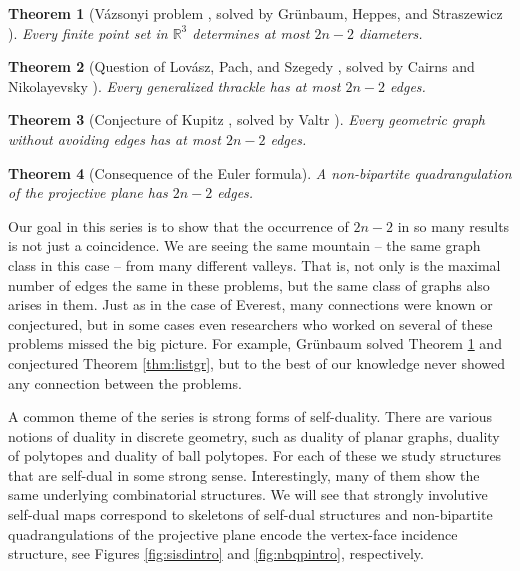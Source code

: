\documentclass{article}
\newtheorem{theorem}{Theorem}[section]
\newcommand{\R}[0]{\mathbb{R}}
\begin{document}
\begin{theorem}[Vázsonyi problem \cite{ERD46}, solved by Grünbaum, Heppes, and Straszewicz \cite{GRU56,HEP56, STR57}]\label{thm:listvazsony}
   Every finite point set in $\R^3$ determines at most $2n-2$ diameters.  
\end{theorem}

\begin{theorem}[Question of Lovász, Pach, and Szegedy \cite{lovasz1997conway}, solved by Cairns and Nikolayevsky \cite{CN00}]
Every generalized thrackle has at most $2n-2$ edges.    
\end{theorem}

\begin{theorem}[Conjecture of Kupitz \cite{KUP84}, solved by Valtr \cite{VALTR98}]
 Every geometric graph without avoiding edges has at most $2n-2$ edges.   
\end{theorem}


\begin{theorem}[Consequence of the Euler formula]
    A non-bipartite quadrangulation of the projective plane has $2n-2$ edges.
\end{theorem}


Our goal in this series is to show that the occurrence of $2n-2$ in so many results is not just a coincidence. We are seeing the same mountain -- the same graph class in this case -- from many different valleys. That is, not only is the maximal number of edges the same in these problems, but the same class of graphs also arises in them. Just as in the case of Everest, many connections were known or conjectured, but in some cases even researchers who worked on several of these problems missed the big picture. For example, Grünbaum solved Theorem \ref{thm:listvazsony} and conjectured Theorem \ref{thm:listgr}, but to the best of our knowledge never showed any connection between the problems. 

A common theme of the series is strong forms of self-duality. There are various notions of duality in discrete geometry, such as duality of planar graphs, duality of polytopes and duality of ball polytopes. For each of these we study structures that are self-dual in some strong sense. Interestingly, many of them show the same underlying combinatorial structures. We will see that strongly involutive self-dual maps correspond to skeletons of self-dual structures and non-bipartite quadrangulations of the projective plane encode the vertex-face incidence structure, see Figures \ref{fig:sisdintro} and \ref{fig:nbqpintro}, respectively. 
\end{document}
